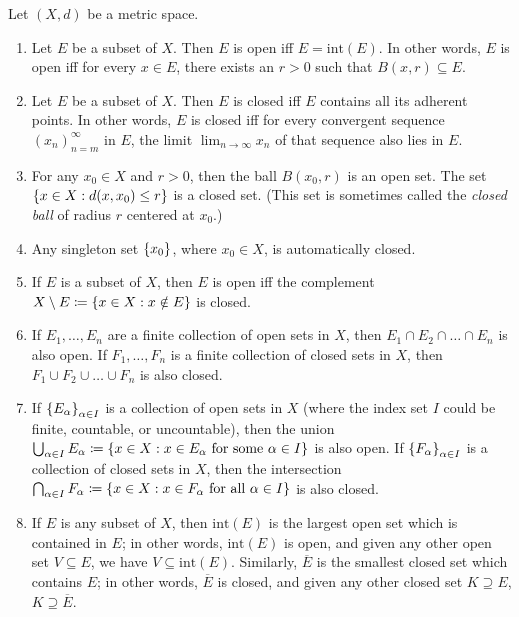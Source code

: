 \begin{prop}\label{ii:1.2.15}
  Let \((X, d)\) be a metric space.
  \begin{enumerate}
    \item\label{ii:1.2.15.a} Let \(E\) be a subset of \(X\).
    Then \(E\) is open iff \(E = \text{int}(E)\).
    In other words, \(E\) is open iff for every \(x \in E\), there exists an \(r > 0\) such that \(B(x, r) \subseteq E\).
    \item\label{ii:1.2.15.b} Let \(E\) be a subset of \(X\).
    Then \(E\) is closed iff \(E\) contains all its adherent points.
    In other words, \(E\) is closed iff for every convergent sequence \((x_n)_{n = m}^\infty\) in \(E\), the limit \(\lim_{n \to \infty} x_n\) of that sequence also lies in \(E\).
    \item\label{ii:1.2.15.c} For any \(x_0 \in X\) and \(r > 0\), then the ball \(B(x_0, r)\) is an open set.
    The set \(\left\lbrace x \in X : d(x, x_0) \leq r\right\rbrace\) is a closed set.
    (This set is sometimes called the \emph{closed ball} of radius \(r\) centered at \(x_0\).)
    \item\label{ii:1.2.15.d} Any singleton set \(\left\lbrace x_0\right\rbrace\), where \(x_0 \in X\), is automatically closed.
    \item\label{ii:1.2.15.e} If \(E\) is a subset of \(X\), then \(E\) is open iff the complement \(X \setminus E \coloneqq \left\lbrace x \in X : x \notin E\right\rbrace\) is closed.
    \item\label{ii:1.2.15.f} If \(E_1, \dots, E_n\) are a finite collection of open sets in \(X\), then \(E_1 \cap E_2 \cap \dots \cap E_n\) is also open.
    If \(F_1, \dots, F_n\) is a finite collection of closed sets in \(X\), then \(F_1 \cup F_2 \cup \dots \cup F_n\) is also closed.
    \item\label{ii:1.2.15.g} If \(\left\lbrace E_\alpha\right\rbrace_{\alpha \in I}\) is a collection of open sets in \(X\) (where the index set \(I\) could be finite, countable, or uncountable), then the union \(\bigcup_{\alpha \in I} E_\alpha \coloneqq \left\lbrace x \in X : x \in E_\alpha \text{ for some } \alpha \in I\right\rbrace\) is also open.
    If \(\left\lbrace F_\alpha\right\rbrace_{\alpha \in I}\) is a collection of closed sets in \(X\), then the intersection \(\bigcap_{\alpha \in I} F_\alpha \coloneqq \left\lbrace x \in X : x \in F_\alpha \text{ for all } \alpha \in I\right\rbrace\) is also closed.
    \item\label{ii:1.2.15.h} If \(E\) is any subset of \(X\), then \(\text{int}(E)\) is the largest open set which is contained in \(E\);
    in other words, \(\text{int}(E)\) is open, and given any other open set \(V \subseteq E\), we have \(V \subseteq \text{int}(E)\).
    Similarly, \(\overline{E}\) is the smallest closed set which contains \(E\);
    in other words, \(\overline{E}\) is closed, and given any other closed set \(K \supseteq E\), \(K \supseteq \overline{E}\).
  \end{enumerate}
\end{prop}

